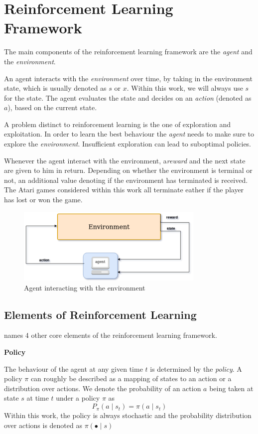 \section{Reinforcement Learning Framework}\raggedbottom 
The main components of the reinforcement learning framework are the \textit{agent} and the \textit{environment}.

An agent interacts with the \textit{environment} over time, by taking in the environment state, which is usually denoted as $s$ or $x$. Within this work, we will always use $s$ for the state.
The agent evaluates the state and decides on an \textit{action} (denoted as $a$), based on the current state. 

A  problem distinct to reinforcement learning is the one of exploration and exploitation. In order to learn the best behaviour the \textit{agent} needs to make sure to explore the \textit{environment}. Insufficient exploration can lead to suboptimal policies.

Whenever the agent interact with the environment, a\textit{reward} and the next state are given to him in return.
Depending on whether the environment is terminal or not, an additional value denoting if the environment has terminated is received. 
The Atari games considered within this work all terminate eather if the player has lost or won the game.

\begin{figure}
\includegraphics[width=90mm]{bilder/RLFramework.png}
\caption{Agent interacting with the environment}
\end{figure}


\subsection{Elements of Reinforcement Learning}
\citet{Sut98} names 4 other core elements of the reinforcement learning framework.

\textbf{Policy}

The behaviour of the agent at any given time $t$ is determined by the \textit{policy}. A policy $\pi$ can roughly be described as a mapping of states to an action or a distribution over actions. 
We denote the probability of an action $a$ being taken at state $s$ at time $t$ under a policy $\pi$ as
\begin{equation}
P_\pi( a \mid s_t) = \pi(a \mid s_t)  
\end{equation}
Within this work, the policy is always stochastic and the probability distribution over actions is denoted as $\pi (\bullet \mid s)$
\pagebreak

